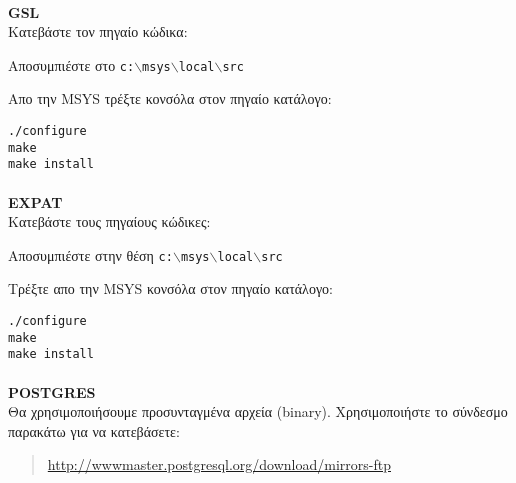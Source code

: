\paragraph{}\textbf{GSL}\\

Κατεβάστε τον πηγαίο κώδικα:

	\begin{quotation}
	\end{quotation}

Αποσυμπιέστε στο \texttt{c:$\backslash$msys$\backslash$local$\backslash$src}

Απο την MSYS τρέξτε κονσόλα στον πηγαίο κατάλογο:

\begin{verbatim}
./configure
make
make install
\end{verbatim}

\paragraph{}\textbf{EXPAT}\\

Κατεβάστε τους πηγαίους κώδικες:

	\begin{quotation}
	\end{quotation}

Αποσυμπιέστε στην θέση \texttt{c:$\backslash$msys$\backslash$local$\backslash$src}

Τρέξτε απο την MSYS κονσόλα στον πηγαίο κατάλογο:

\begin{verbatim}
./configure
make
make install
\end{verbatim}

\paragraph{}\textbf{POSTGRES}\\

Θα χρησιμοποιήσουμε προσυνταγμένα αρχεία (binary). Χρησιμοποιήστε το σύνδεσμο παρακάτω για να κατεβάσετε:

	\begin{quotation}
\url{http://wwwmaster.postgresql.org/download/mirrors-ftp}
	\end{quotation}

